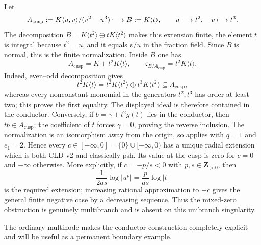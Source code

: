 \begin{example}
\label{ex:p122-cusp-radial-psh-classification}
Let
\[
 A_{\mathrm{cusp}}:=K\langle u,v\rangle/(v^2-u^3)
      \lhook\joinrel\longrightarrow B:=K\langle t\rangle,
 \qquad u\longmapsto t^2,\quad v\longmapsto t^3.
\]
The decomposition
\(B=K\langle t^2\rangle\oplus tK\langle t^2\rangle\) makes this extension
finite, the element \(t\) is integral because \(t^2=u\), and it equals
\(v/u\) in the fraction field.  Since \(B\) is normal, this is the finite
normalization.  Inside \(B\) one has
\[
 A_{\mathrm{cusp}}=K+t^2K\langle t\rangle,
 \qquad
 \mathfrak c_{B/A_{\mathrm{cusp}}}=t^2K\langle t\rangle.
\]
Indeed, even--odd decomposition gives
\[
 t^2K\langle t\rangle
   =t^2K\langle t^2\rangle\oplus t^3K\langle t^2\rangle
   \subseteq A_{\mathrm{cusp}},
\]
whereas every nonconstant monomial in the generators \(t^2,t^3\) has order
at least two; this proves the first equality.  The displayed ideal is
therefore contained in the conductor.  Conversely, if
\(b=\gamma+t^2g(t)\) lies in the conductor, then
\(tb\in A_{\mathrm{cusp}}\); the coefficient of \(t\) forces
\(\gamma=0\), proving the reverse inclusion.
The normalization is an isomorphism away from the origin, so
 applies with
\(q=1\) and \(e_1=2\).  Hence every
\(c\in[-\infty,0]=\{0\}\cup[-\infty,0)\) has a unique radial extension
which is both CLD-v2 and classically psh.  Its value at the cusp is zero for
\(c=0\) and \(-\infty\) otherwise.  More explicitly, if
\(c=-p/s<0\) with \(p,s\in\mathbf Z_{>0}\), then
\[
       \frac{1}{2as}\log|u^p|
          =\frac{p}{as}\log|t|
\]
is the required extension; increasing rational approximation to \(-c\)
gives the general finite negative case by a decreasing sequence.  Thus the
mixed-zero obstruction is genuinely multibranch and is absent on this
unibranch singularity.
\end{example}

The ordinary multinode makes the conductor construction completely
explicit and will be useful as a permanent boundary example.

